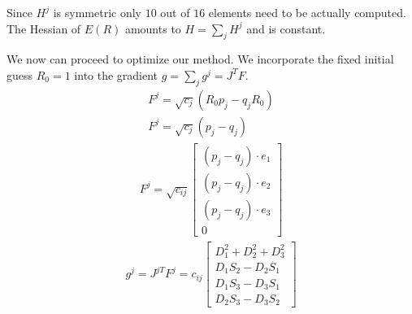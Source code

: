 \documentclass{birkjour}
\numberwithin{equation}{section}
\begin{document}
Since $H^j$ is symmetric only $10$ out of $16$ elements need to be actually computed. The Hessian of $E(R)$ amounts to $H = \sum_j{H^j}$ and is constant.

We now can proceed to optimize our method. We incorporate the fixed initial guess $R_0 = 1$ into the gradient $g = \sum_j{g^j} = J^T F$.
\begin{eqnarray*}
F^j = \sqrt{c_j} (R_0 p_j - q_j R_0)\\
F^j = \sqrt{c_j} (p_j - q_j)
\end{eqnarray*}
\begin{eqnarray*}
F^j = \sqrt{c_{ij}} 
\left[\begin{array}{c}(p_j - q_j) \cdot e_1 \\ (p_j - q_j) \cdot e_2 \\ (p_j - q_j) \cdot e_3 \\ 0\end{array}\right]
\end{eqnarray*}
\begin{eqnarray*}
g^j = J^{jT} F^j = c_{ij}
\left[\begin{array}{c} D_1^2 + D_2^2 + D_3^2 \\ D_1 S_2 - D_2 S_1 \\ D_1 S_3 - D_3 S_1 \\ D_2 S_3 - D_3 S_2\end{array}\right]
\end{eqnarray*}
\end{document}
